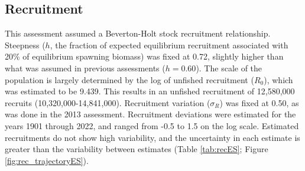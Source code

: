 \documentclass[11pt,
  letterpaper,
]{article}
\begin{document}
\hypertarget{recruitment}{%
\subsection*{Recruitment}\label{recruitment}}

This assessment assumed a Beverton-Holt stock recruitment relationship. Steepness (\(h\), the fraction of expected equilibrium recruitment associated with 20\% of equilibrium spawning biomass) was fixed at 0.72, slightly higher than what was assumed in previous assessments (\(h=0.60\)). The scale of the population is largely determined by the log of unfished recruitment (\(R_0\)), which was estimated to be 9.439. This results in an unfished recruitment of 12,580,000 recruits (10,320,000-14,841,000). Recruitment variation (\(\sigma_R\)) was fixed at 0.50, as was done in the 2013 assessment. Recruitment deviations were estimated for the years 1901 through 2022, and ranged from -0.5 to 1.5 on the log scale. Estimated recruitments do not show high variability, and the uncertainty in each estimate is greater than the variability between estimates (Table \ref{tab:recES}; Figure \ref{fig:rec_trajectoryES}).

\begingroup\fontsize{10}{12}\selectfont
\begingroup\fontsize{10}{12}\selectfont
\end{document}
